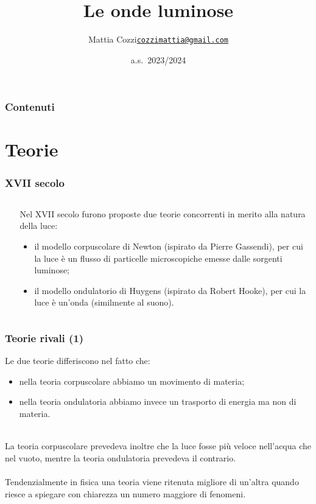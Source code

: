 \documentclass[]{beamer}
\title{Le onde luminose}
\author{\texorpdfstring{Mattia Cozzi\newline\href{mailto:cozzimattia@gmail.com}{\texttt{cozzimattia@gmail.com}}}{Mattia Cozzi}}
\date{a.s.~2023/2024}
\theoremstyle{plain}
\begin{document}
\begin{frame}
  \titlepage
\end{frame}





\begin{frame}
\frametitle{Contenuti}
\tableofcontents
\end{frame}


\section{Teorie}


\begin{frame}
\frametitle{XVII secolo}
\begin{columns}
\begin{column}{0.2\textwidth}
~
\end{column}
\begin{column}{0.7\textwidth}
Nel XVII secolo furono proposte due teorie concorrenti in merito alla natura della luce:
\begin{itemize}
\item<1-> il \alert<1>{modello corpuscolare} di Newton (ispirato da Pierre Gassendi), per cui la luce è un flusso di particelle microscopiche emesse dalle sorgenti luminose;\pause
\item<2-> il \alert<2>{modello ondulatorio} di Huygens (ispirato da Robert Hooke), per cui la luce è un'onda (similmente al suono).
\end{itemize}

\end{column}
\end{columns}
\end{frame}



\begin{frame}
\frametitle{Teorie rivali (1)}
Le due teorie differiscono nel fatto che:
\begin{itemize}
  \item nella teoria corpuscolare abbiamo un \alert<1>{movimento di materia};\pause
  \item nella teoria ondulatoria abbiamo invece un \alert<2>{trasporto di energia} ma non di materia.
\end{itemize}
~\pause\\
La teoria corpuscolare prevedeva inoltre che la luce fosse \alert<1>{più veloce nell'acqua che nel vuoto}, mentre la teoria ondulatoria prevedeva il contrario.\\~\pause\\
Tendenzialmente in fisica una teoria viene ritenuta migliore di un'altra quando riesce a spiegare con chiarezza un numero maggiore di fenomeni.
\end{frame}
\end{document}
